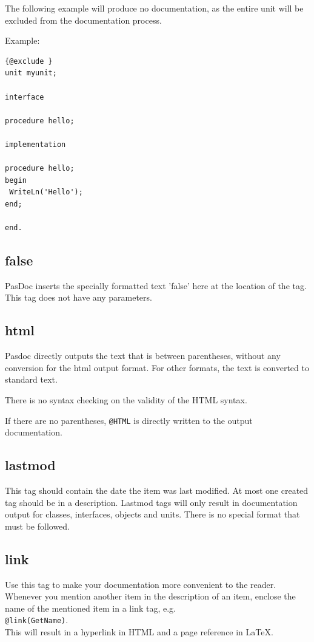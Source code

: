 \documentclass[11pt]{article}
\begin{document}
The following example will produce no documentation, as the entire unit
will be excluded from the documentation process.

Example:
\begin{verbatim}
{@exclude }
unit myunit;

interface

procedure hello;

implementation

procedure hello;
begin
 WriteLn('Hello');
end;

end.
\end{verbatim}


\subsection{false}
PasDoc inserts the specially formatted text 'false' here
at the location of the tag. This tag does not have any
parameters.

\subsection{html}
Pasdoc directly outputs the text that is between parentheses,
without any conversion for the html output format. For other
formats, the text is converted to standard text.

There is no syntax checking on the validity of the HTML syntax.

If there are no parentheses, {\tt @HTML} is directly written
to the output documentation.

\subsection{lastmod}

This tag should contain the date the item was last modified.
At most one created tag should be in a description.
Lastmod tags will only result in documentation output for
classes, interfaces, objects and units.
There is no special format that must be followed.

\subsection{link}

Use this tag to make your documentation more convenient to the reader.
Whenever you mention another item in the description of an item,
enclose the name of the mentioned item in a link tag, e.g.\\
{\tt @link(GetName)}.\\
This will result in a hyperlink in HTML and a page reference in
\LaTeX.
\end{document}

